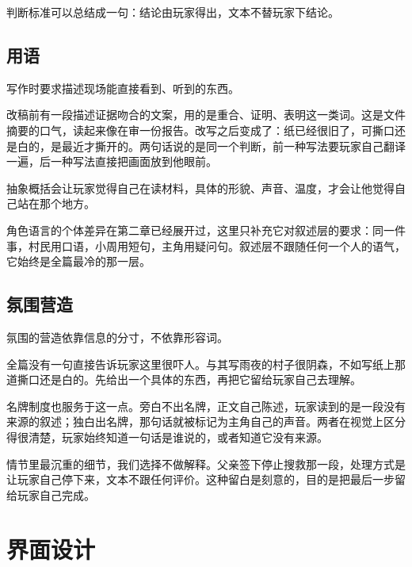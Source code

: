 判断标准可以总结成一句：结论由玩家得出，文本不替玩家下结论。

\subsection{用语}

写作时要求描述现场能直接看到、听到的东西。

改稿前有一段描述证据吻合的文案，用的是重合、证明、表明这一类词。这是文件摘要的口气，读起来像在审一份报告。改写之后变成了：纸已经很旧了，可撕口还是白的，是最近才撕开的。两句话说的是同一个判断，前一种写法要玩家自己翻译一遍，后一种写法直接把画面放到他眼前。

抽象概括会让玩家觉得自己在读材料，具体的形貌、声音、温度，才会让他觉得自己站在那个地方。

角色语言的个体差异在第二章已经展开过，这里只补充它对叙述层的要求：同一件事，村民用口语，小周用短句，主角用疑问句。叙述层不跟随任何一个人的语气，它始终是全篇最冷的那一层。

\subsection{氛围营造}

氛围的营造依靠信息的分寸，不依靠形容词。

全篇没有一句直接告诉玩家这里很吓人。与其写雨夜的村子很阴森，不如写纸上那道撕口还是白的。先给出一个具体的东西，再把它留给玩家自己去理解。

名牌制度也服务于这一点。旁白不出名牌，正文自己陈述，玩家读到的是一段没有来源的叙述；独白出名牌，那句话就被标记为主角自己的声音。两者在视觉上区分得很清楚，玩家始终知道一句话是谁说的，或者知道它没有来源。

情节里最沉重的细节，我们选择不做解释。父亲签下停止搜救那一段，处理方式是让玩家自己停下来，文本不跟任何评价。这种留白是刻意的，目的是把最后一步留给玩家自己完成。

\section{界面设计}


